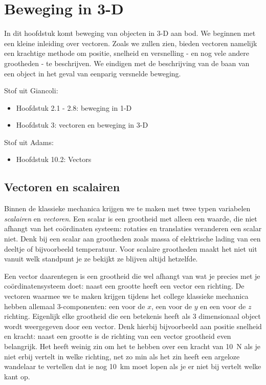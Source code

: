 \chapter{Beweging in 3-D}

In dit hoofdstuk komt beweging van objecten in 3-D aan bod. We beginnen met een kleine 
inleiding over vectoren. Zoals we zullen zien, bieden vectoren namelijk een krachtige methode om positie, snelheid en versnelling - en nog vele andere grootheden - te beschrijven. We eindigen met de beschrijving van de baan van een object in het geval van eenparig versnelde beweging.

\noindent Stof uit Giancoli:
\begin{itemize}
\item Hoofdstuk 2.1 - 2.8: beweging in 1-D
\item Hoofdstuk 3: vectoren en beweging in 3-D
\end{itemize}

\noindent Stof uit Adams:
\begin{itemize}
\item Hoofdstuk 10.2: Vectors
\end{itemize}

\section{Vectoren en scalairen}

Binnen de klassieke mechanica krijgen we te maken met twee typen variabelen {\it scalairen} en
{\it vectoren}. Een scalar is een grootheid met alleen een waarde, die niet afhangt van het co\"{o}rdinaten systeem: rotaties en translaties veranderen een scalar niet. Denk bij een scalar 
aan grootheden zoals massa of elektrische lading van een deeltje of bijvoorbeeld temperatuur. 
Voor scalaire grootheden maakt het niet uit vanuit welk standpunt je ze bekijkt ze blijven
altijd hetzelfde.

Een vector daarentegen is een grootheid die wel afhangt van wat je precies met je co\"{o}rdinatensysteem doet: naast een grootte heeft een vector een richting. De vectoren waarmee we te maken krijgen tijdens het college klassieke mechanica hebben allemaal  3-componenten: een voor de $x$, een voor de $y$ en een voor de $z$ richting. Eigenlijk elke grootheid die een betekenis heeft als 3 dimensionaal object wordt weergegeven door een vector.  Denk hierbij
bijvoorbeeld aan positie snelheid en kracht: naast een grootte is de richting van een vector 
grootheid even belangrijk. Het heeft weinig zin om het te hebben over een kracht van 10~N als
je niet erbij vertelt in welke richting, net zo min als het zin heeft een argeloze wandelaar
te vertellen dat ie nog 10~km moet lopen als je er niet bij vertelt welke kant op.

